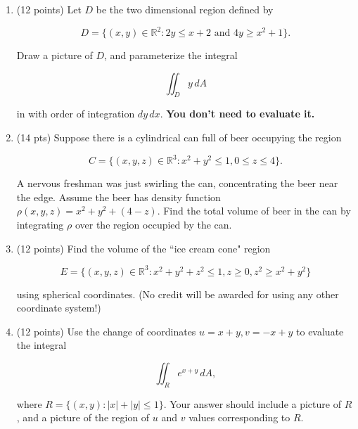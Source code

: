 \documentclass[12 pt]{report}
\begin{document}
\newpage

\begin{enumerate}

\item (12 points) Let $D$ be the two dimensional region defined by 

\[
D = \{(x,y) \in \mathbb{R}^2: 2y \leq x + 2 \text{ and } 4y \geq x^2 + 1\}.
\]

Draw a picture of $D$, and parameterize the integral

\[
\iint_D y \, dA
\]

in with order of integration $dy \, dx$. \textbf{You don't need to evaluate it.} 

\newpage

\item (14 pts) Suppose there is a cylindrical can full of beer occupying the region 

\[
C = \{(x,y,z) \in \mathbb{R}^3: x^2 + y^2 \leq 1, 0 \leq z \leq 4\}.
\]

A nervous freshman was just swirling the can, concentrating the beer near the edge. Assume the beer has density function $\rho(x,y,z) = x^2 + y^2 + (4-z)$. Find the total volume of beer in the can by integrating $\rho$ over the region occupied by the can. 

\newpage

\item (12 points) Find the volume of the ``ice cream cone" region 

\[
E = \{(x,y,z) \in \mathbb{R}^3: x^2+y^2+z^2 \leq 1, z \geq 0, z^2 \geq x^2+y^2\}
\] 

using spherical coordinates. (No credit will be awarded for using any other coordinate system!)

\newpage


\item (12 points) Use the change of coordinates $u = x+y, v = -x+y$ to evaluate the integral

\[
\iint_R e^{x+y} \, dA,
\]

where $R = \{(x,y): |x| + |y| \leq 1\}.$ Your answer should include a picture of $R$, and a picture of the region of $u$ and $v$ values corresponding to $R$. 


\end{enumerate}
\end{document}
